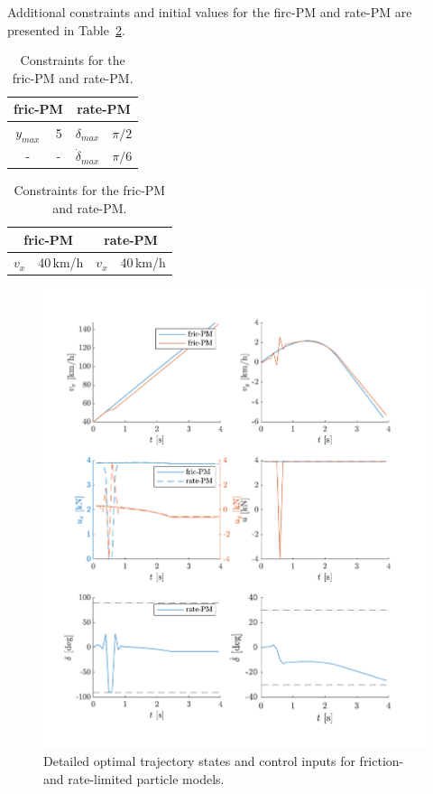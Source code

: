 Additional constraints and initial values for the firc-PM and rate-PM are presented in Table~\ref{tab:const_p1}. 

\begin{table}[h]
    \centering
    \begin{subtable}[h]{0.4\textwidth}
        \begin{tabular}{c|c||c|c}
            \multicolumn{2}{c||}{fric-PM} & \multicolumn{2}{c}{rate-PM}\\
            \hline
            $y_{max}$ & 5 & $\delta_{max}$ & $\pi/2$ \\
            - & - & $\dot\delta_{max}$ & $\pi/6$ 
        \end{tabular}
        \caption{Constraints.}
        \label{tab:const_p1a}
    \end{subtable}
    \begin{subtable}[h]{0.4\textwidth}
        \begin{tabular}{c|c||c|c}
            \multicolumn{2}{c||}{fric-PM} & \multicolumn{2}{c}{rate-PM}\\
            \hline
            $v_x$ & 40\,km/h & $v_x$ & 40\,km/h
        \end{tabular}
        \caption{Initial conditions.}
        \label{tab:const_p1a}
    \end{subtable}
    \caption{Constraints for the fric-PM and rate-PM.}
    \label{tab:const_p1}
\end{table}

\begin{figure}[h!]
    \includegraphics{figures/flp_avoid_detailed.pdf}
    \caption{Detailed optimal trajectory states and control inputs for friction- and rate-limited particle models.}
    \label{fig:prob1_res_detail}
\end{figure}

